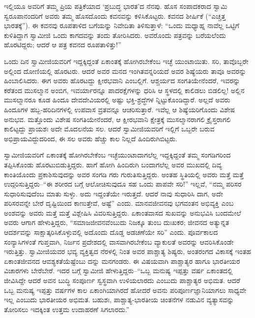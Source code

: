 ಇಲ್ಲಿಯೂ ಅವರಿಗೆ ತಮ್ಮ ಪ್ರಿಯ ಪತ್ರಿಕೆಯಾದ ‘ಪ್ರಬುದ್ಧ ಭಾರತ’ದ ನೆನಪು. ಹೊಸ ಸಂಪಾದಕರಾದ ಸ್ವಾಮಿ ಸ್ವರೂಪಾನಂದರಿಗೆ ಅವರು ತಮ್ಮ ಹೊಸದೊಂದು ಕವನವನ್ನು ಕಳಿಸಿಕೊಟ್ಟರು. ಕವನದ ಶೀರ್ಷಿಕೆ (“ಎಚ್ಚತ್ತ ಭಾರತಕ್ಕೆ”). ಈ ಕವನವು ರೂಪತಾಳಿದ ಬಗೆಯನ್ನು ನಿವೇದಿತಾ ತಿಳಿಸುತ್ತಾಳೆ: “ಒಂದು ಮಧ್ಯಾಹ್ನ ನಾವೆಲ್ಲ ಒಟ್ಟಿಗೆ ಕುಳಿತಿದ್ದಾಗ ಸ್ವಾಮೀಜಿ ಒಂದು ಕಾಗದವನ್ನು ತಂದು ತೋರಿಸಿದರು. ಅವರೊಂದು ಪತ್ರವನ್ನು ಬರೆಯಲೆಂದು ಹೊರಟಿದ್ದರು; ಆದರೆ ಆ ಪತ್ರ ಕವನದ ರೂಪತಾಳಿತ್ತು!”

ಒಂದು ದಿನ ಸ್ವಾಮೀಜಿಯವರಿಗೆ ಇದ್ದಕ್ಕಿದ್ದಂತೆ ಏಕಾಂತಕ್ಕೆ ಹೋಗಿರಬೇಕೆಂಬ ಇಚ್ಛೆ ಯುಂಟಾಯಿತು. ಸರಿ, ತಾವೊಬ್ಬರೇ ಅಲ್ಲಿಂದ ದೋಣಿಯಲ್ಲಿ ಹೊರಟರು. ಆದರೆ ಅವರ ಮನದ ಇಂಗಿತವನ್ನರಿಯದೆ ಅವರ ಶಿಷ್ಯೆಯರು ತಾವೂ ಅವರನ್ನು ಹಿಂಬಾಲಿಸಿದರು. ಈಗ ಅವರು ಹೊರಟದ್ದು ಕ್ಷೀರಭವಾನಿ ಎಂಬಲ್ಲಿಗೆ. ಆಶ್ಚರ್ಯದ ಸಂಗತಿಯೇನೆಂದರೆ, ಇವರನ್ನು ಕರೆತಂದ ಮುಸಲ್ಮಾನ ಅಂಬಿಗ, ಇವರ್ಯಾರನ್ನೂ ಪಾದರಕ್ಷೆಗಳನ್ನು ಧರಿಸಿ ಆ ಸ್ಥಳದಲ್ಲಿ ಕಾಲಿಡಲು ಬಿಡಲಿಲ್ಲ! ಅಲ್ಲಿನ ಮುಸಲ್ಮಾನರೂ ಕೂಡ ಹಿಂದೂ ದೇವದೇವಿಯರಲ್ಲಿ ಅಷ್ಟು ಭಕ್ತಿ-ಶ್ರದ್ಧೆಗಳ ನ್ನಿಟ್ಟುಕೊಂಡಿದ್ದಾರೆ. ಅಲ್ಲದೆ ಅವರು ಹಿಂದೂಗಳ ಹಬ್ಬ-ಹರಿದಿನಗಳಲ್ಲಿ ಉಪವಾಸ ವ್ರತವನ್ನೂ ಆಚರಿಸುತ್ತಾರೆ. ಇವೆಲ್ಲ ಆ ಶಿಷ್ಯೆಯರಿಗೊಂದು ವಿಶೇಷ ಅನುಭವ. ಮತ್ತೊಂದು ವಿಶೇಷ ಸಂಗತಿಯೇನೆಂದರೆ, ಆ ಕ್ಷೀರಭವಾನಿ ಕ್ಷೇತ್ರಕ್ಕೆ ಮುಸಲ್ಮಾನರಾಗಲಿ ಕ್ರೈಸ್ತರಾಗಲಿ ಕಾಲಿಟ್ಟದ್ದು ಪ್ರಾಯಶಃ ಅದೇ ಮೊದಲನೆಯ ಸಲ. ಆದರೆ ಸ್ವಾಮೀಜಿಯವರಿಗೆ ಇಲ್ಲಿಗೆ ಒಬ್ಬರೇ ಬರುವ ಅಭಿಪ್ರಾಯವಿದ್ದುದರಿಂದ, ಈ ಸಲ ಅವರು ಹೆಚ್ಚು ಕಾಲ ನಿಲ್ಲದೆ ಹಿಂದಿರುಗಿಬಿಟ್ಟರು.

ಸ್ವಾಮೀಜಿಯವರಿಗೆ ಏಕಾಂತಕ್ಕೆ ಹೋಗಿರಬೇಕೆಂಬ ಇಚ್ಛೆಯುಂಟಾದಾಗಲೆಲ್ಲ ಇದ್ದಕ್ಕಿದ್ದಂತೆ ತಮ್ಮ ಸಂಗಡಿಗರಿಂದ ತಪ್ಪಿಸಿಕೊಂಡು ಹೊರಟುಬಿಡುತ್ತಿದ್ದರು. ಹಾಗೆ ಹೋಗಿ ಹಿಂದಿರುಗಿ ಬಂದಾಗಲೆಲ್ಲ ಅವರ ಮುಖದಲ್ಲಿ ದಿವ್ಯ ಕಾಂತಿಯೊಂದು ಪ್ರಕಾಶಿಸುವುದನ್ನು ಅವರ ಸಂಗಡಿ ಗರು ಗುರುತಿಸುತ್ತಿದ್ದರು. ಅಂತಹ ಸ್ಥಿತಿಯಲ್ಲಿ ಅವರು ಮತ್ತೆ ಮತ್ತೆ ಉದ್ಗರಿಸುತ್ತಿದ್ದರು–“ಈ ಶರೀರದ ಬಗ್ಗೆ ಆಲೋಚಿಸುವುದೂ ಸಹ ಒಂದು ಪಾಪವೇ ಸರಿ!” ಇಲ್ಲವೆ, “ನಮ್ಮ ಪರಿಸರ ಸುಧಾರಿಸುವುದೆಂಬ ಮಾತು ಸುಳ್ಳು. ಅದು ಇದ್ದಂತೆಯೇ ಇರುತ್ತದೆ. ಆದರೆ ನಾವು ಸುಧಾರಿಸಿ ದಾಗ, ಅದೇ ಪರಿಸರವನ್ನೇ ಬೇರೆ ದೃಷ್ಟಿಯಿಂದ ಕಾಣುತ್ತೇವೆ, ಅಷ್ಟೆ” ಎಂದು. ಮಾನವಜೀವನವು ಭಗವಂತನ ಅಭಿವ್ಯಕ್ತಿ ಎಂಬ ಅಂಶವನ್ನು ಅವರು ಮತ್ತೆ ಮತ್ತೆ ವಿಶ್ಲೇಷಿಸಿ ವಿವರಿಸುತ್ತಿದ್ದರು. ಏಕಾಂತವಾಸದ ಸುಖವನ್ನು ಅನುಭವಿಸಿ ಬಂದಮೇಲೆ ಅವರು ಆಗಾಗ ಹೇಳುತ್ತಿದ್ದರು, “ಸಮಾಜಜೀವನವೆಂಬುದು ನಿಜಕ್ಕೂ ತುಂಬ ದುಃಖಕರ; ಜೀವನದ ಅತ್ಯುನ್ನತ ಆದರ್ಶವನ್ನು ಸಾಕ್ಷಾತ್ಕರಿಸಿಕೊಳ್ಳುವಲ್ಲಿ ಅದೊಂದು ದೊಡ್ಡ ಅಡಚಣೆಯೇ ಸರಿ” ಎಂದು. ಪೂರ್ವಕಾಲದ ಸಂನ್ಯಾಸಿಗಳಂತೆ ಗುಪ್ತವಾಗಿ, ನಿರ್ಜನ ಪ್ರದೇಶದಲ್ಲಿ ವಾಸವಾಗಿರಬೇಕೆಂಬ ವ್ಯಾಕುಲತೆ ಅವರನ್ನು ಆವರಿಸಿಕೊಂಡೇ ಇರುತ್ತಿತ್ತು. ಸ್ವಾಮೀಜಿಯವರ ಭವ್ಯ ವ್ಯಕ್ತಿತ್ವದ ನೆರಳಲ್ಲಿ ನಿಂತ ಅವರ ಪಾಶ್ಚಾತ್ಯ ಶಿಷ್ಯರು, ಅಂತರಂಗದ ವಿಕಾಸಕ್ಕೆ ಇಂತಹ ಏಕಾಂತಜೀವನದ ಆವಶ್ಯಕತೆಯೆಷ್ಟೆಂಬು ದನ್ನು ಮನಗಂಡರು. ಈ ವಿಷಯವಾಗಿ ಪಾಶ್ಚಾತ್ಯರ ಹಾಗೂ ಭಾರತೀಯರ ವಿಚಾರಗಳು ಬೇರೆಬೇರೆ. ಇದರ ಬಗ್ಗೆ ಸ್ವಾಮೀಜಿ ಹೇಳುತ್ತಿದ್ದರು–“ಒಬ್ಬ ಮನುಷ್ಯ ಇಪ್ಪತ್ತು ವರ್ಷ ಏಕಾಂತದಲ್ಲಿ ಜೀವಿಸಿದ್ದೇ ಆದರೆ ಅವನ ಬುದ್ಧಿ ಸಂಪೂರ್ಣ ಸ್ವಸ್ಥವಾಗಿ ಉಳಿಯಲಾರದು ಎಂಬುದು ಪಾಶ್ಚಾತ್ಯರ ಅಭಿಮತ. ಆದರೆ ಒಬ್ಬ ಮನುಷ್ಯ ಇಪ್ಪತ್ತು ವರ್ಷಗಳ ಕಾಲ ಏಕಾಂಗಿಯಾಗಿರದೆ ಹೋದರೆ ಅವನು ಪರಿಪೂರ್ಣಜ್ಞಾನಿಯಾಗಲು ಸಾಧ್ಯವೇ ಇಲ್ಲ ಎಂಬುದು ಭಾರತೀಯರ ಅಭಿಮತ. ಬಹುಶಃ, ಪಾಶ್ಚಾತ್ಯ-ಭಾರತೀಯ ಚಿಂತನೆಗಳ ನಡುವಿನ ವ್ಯತ್ಯಾಸವನ್ನು ತೋರಿಸಲು ಇದಕ್ಕಿಂತ ಉತ್ತಮ ಉದಾಹರಣೆ ಸಿಗಲಾರದು.”

